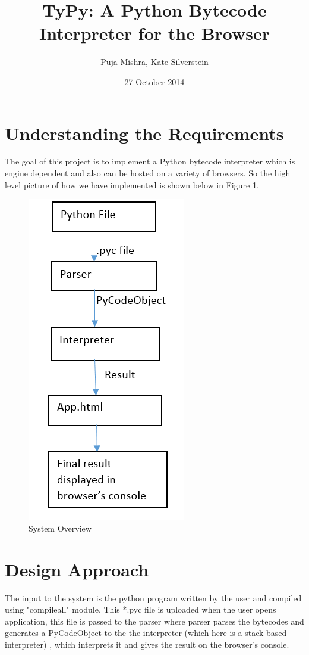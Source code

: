 \documentclass[10pt,a4paper]{article}
\title{TyPy: A Python Bytecode Interpreter for the Browser}
\author{Puja Mishra, Kate Silverstein}
\date{27 October 2014}
\begin{document}
\maketitle
\section{Understanding the Requirements}

The goal of this project is to implement a Python bytecode interpreter which is engine dependent and also can be hosted on a variety of browsers. So the high level picture of how we have implemented is shown below in Figure 1.

\begin{figure}[ht!]
\caption{System Overview}
\centering
\includegraphics[scale=0.8]{../Report/UnderstandingTheReq.png} 
\end{figure}

\section{Design Approach}

The input to the system is the python program written by the user and compiled using "compileall" module. This *.pyc file is uploaded when the user opens application, this file is passed to the parser where parser parses the bytecodes and generates a PyCodeObject to the the interpreter (which here is a stack based interpreter) , which interprets it and gives the result on the browser's console.
\end{document}
